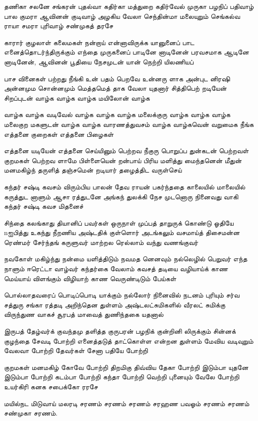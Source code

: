 \begin{flushleft}
{        தணிகா சலனே சங்கரன் புதல்வா
        கதிர்கா மத்துறை கதிர்வேல் முருகா
        பழநிப் பதிவாழ் பால குமரா
        ஆவினன் குடிவாழ் அழகிய வேலா
        செந்தின்மா மலையுறும் செங்கல்வ ராயா
        சமரா புரிவாழ் சண்முகத் தரசே

        காரார் குழலாள் கலைமகள் நன்றாய்
        என்னாவிருக்க யானுனைப் பாட
        எனைத்தொடர்ந்திருக்கும் எந்தை முருகனைப்
        பாடினே னாடினேன் பரவசமாக
        ஆடினே னாடினேன், ஆவினன் பூதியை
        நேசமுடன் யான் நெற்றி யிலணியப்

        பாச வினைகள் பற்றது நீங்கி
        உன் பதம் பெறவே உன்னரு ளாக
        அன்புட னிரஷி அன்னமும சொன்னமும்
        மெத்தமெத் தாக வேலா யுதனார்
        சித்திபெற் றடியேன் சிறப்புடன் வாழ்க
        வாழ்க வாழ்க மயிலோன் வாழ்க

        வாழ்க வாழ்க வடிவேல் வாழ்க
        வாழ்க வாழ்க மலைக்குரு வாழ்க
        வாழ்க வாழ்க மலைகுற மகளுடன்
        வாழ்க வாழ்க வாரணத்துவசம்
        வாழ்க வாழ்கவென் வறுமைக நீங்க
        எத்தனை குறைகள் எத்தனை பிழைகள்

        எத்தனை யடியேன் எத்தனை செய்யினும்
        பெற்றவ நீகுரு பொறுப்ப துன்கடன்
        பெற்றவள் குறமகள் பெற்றவ ளாமே
        பிள்ளையென் றன்பாய் பிரிய மளித்து
        மைந்தனென் மீதுன் மனமகிழ்ந் தருளித்
        தஞ்சமென் றடியார் தழைத்திட வருள்செய்

        கந்தர் சஷ்டி கவசம் விரும்பிய
        பாலன் தேவ ராயன் பகர்ந்ததை
        காலையில் மாலையில் கருத்துட னாளும்
        ஆசா ரத்துடனே அங்கந் துலக்கி
        நேச முடனொரு நினைவது வாகி
        கந்தர் சஷ்டி கவச மிதனைச்

        சிந்தை கலங்காது தியானிப் பவர்கள்
        ஒருநாள் முப்பத் தாறுருக் கொண்டு
        ஓதியே nஐபித்து உகந்து நீறணிய
        அஷ்டதிக் குள்ளொர் அடங்கலும் வசமாய்த்
        திசைமன்ன ரெண்மர் சேர்ந்தங் கருளுவர்
        மாற்றல ரெல்லாம் வந்து வணங்குவர்

        நவகோள் மகிழ்ந்து நன்மை யளித்திடும்
        நவமத னெனவும் நல்லெழில் பெறுவர்
        எந்த நாளும் ஈரெட்டா வாழ்வர்
        கந்தர்கை வேலாம் கவசத் தடியை
        வழியாய்க் காண மெய்யாய் விளங்கும்
        விழியாற் காண வெருண்டிடும் பேய்கள்

        பொல்லாதவரைப் பொடிப்பொடி யாக்கும்
        நல்லோர் நினைவில் நடனம் புரியும்
        சர்வ சத்துரு சங்கா ரத்தடி
        அறிந்தென துள்ளம் அஷ்டலட்சுமிகளில்
        வீரலட் சுமிக்கு விருந்துண வாகச்
        சூரபத் மாவைத் துணிந்தகை யதனால்

        இருபத் தேழ்வர்க் குவந்தமு தளித்த
        குருபரன் பழநிக் குன்றினி லிருக்கும்
        சின்னக் குழந்தை சேவடி போற்றி
        எனைத்தடுத் தாட்கொள்ள என்றன துள்ளம்
        மேவிய வடிவுறும் வேலவா போற்றி
        தேவர்கள் சேனா பதியே போற்றி

        குறமகள் மனமகிழ் கோவே போற்றி
        திறமிகு திவ்விய தேகா போற்றி
        இடும்பா யுதனே இடும்பா போற்றி
        கடம்பா போற்றி கந்தா போற்றி
        வெற்றி புனையும் வேலே போற்றி
        உயர்கிரி கனக சபைக்கோ ரரசே

        மயில்நட மிடுவாய் மலரடி சரணம்
        சரணம் சரணம் சரஹண பவஓம்
    சரணம் சரணம் சண்முகா சரணம்.}
\end{flushleft}
